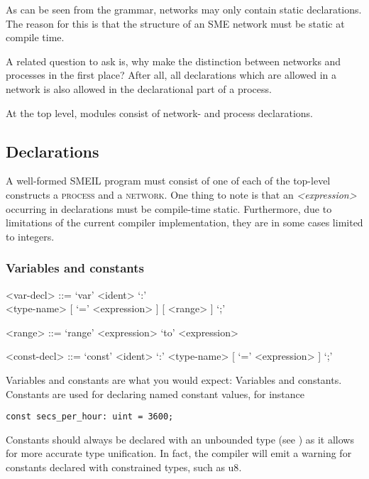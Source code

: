 As can be seen from the grammar, networks may only contain static
declarations. The reason for this is that the structure of an SME network must
be static at compile time. 

A related question to ask is, why make the distinction between networks and
processes in the first place? After all, all declarations which are allowed in
a network is also allowed in the declarational part of a process. 


At the top level, modules consist of network- and process declarations. 


\subsection{Declarations}
A well-formed SMEIL program must consist of one of each of the top-level
constructs a \textsc{process} and a \textsc{network}. One thing to note is that
an {\itshape <expression>} occurring in declarations must be compile-time
static. Furthermore, due to limitations of the current compiler implementation,
they are in some cases limited to integers.

\subsubsection{Variables and constants}
\begin{grammar}
  <var-decl> ::= `var' <ident> `:' \\ <type-name> [ `=' <expression> ] [ <range> ] `;'

  <range> ::= `range' <expression> `to' <expression>

  <const-decl> ::= `const' <ident> `:' <type-name> [ `=' <expression> ] `;'
\end{grammar}

Variables and constants are what you would expect: Variables and
constants. Constants are used for declaring named constant values, for instance
\begin{lstlisting}[language=smeil]
const secs_per_hour: uint = 3600;
\end{lstlisting}
Constants should always be declared with an unbounded type (see
) as it allows for more accurate type unification. In fact,
the compiler will emit a warning for constants declared with constrained types,
such as {\ttfamily u8}.

